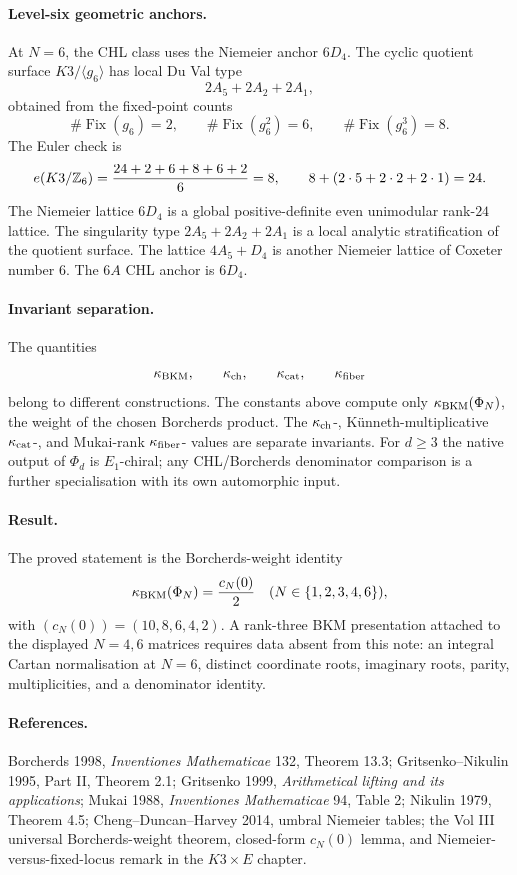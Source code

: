 \paragraph{Level-six geometric anchors.}
At $N=6$, the CHL class uses the Niemeier anchor $6D_4$. The cyclic
quotient surface $K3/\langle g_6\rangle$ has local Du Val type
\[
  2A_5+2A_2+2A_1,
\]
obtained from the fixed-point counts
\[
  \#\operatorname{Fix}(g_6)=2,\qquad
  \#\operatorname{Fix}(g_6^2)=6,\qquad
  \#\operatorname{Fix}(g_6^3)=8.
\]
The Euler check is
\[
  e(K3/\mathbb{Z}_6)=\frac{24+2+6+8+6+2}{6}=8,\qquad
  8+(2\cdot 5+2\cdot 2+2\cdot 1)=24.
\]
The Niemeier lattice $6D_4$ is a global positive-definite even
unimodular rank-$24$ lattice. The singularity type
$2A_5+2A_2+2A_1$ is a local analytic stratification of the quotient
surface. The lattice $4A_5+D_4$ is another Niemeier lattice of Coxeter
number $6$. The $6A$ CHL anchor is $6D_4$.

\paragraph{Invariant separation.}
The quantities
\[
  \kappa_{\mathrm{BKM}},\qquad \kappa_{\mathrm{ch}},\qquad \kappa_{\mathrm{cat}},\qquad \kappa_{\mathrm{fiber}}
\]
belong to different constructions. The constants above compute only
$\kappa_{\mathrm{BKM}}(\Phi_N)$, the weight of the chosen Borcherds product. The
$\kappa_{\mathrm{ch}}$-, K\"unneth-multiplicative $\kappa_{\mathrm{cat}}$-, and Mukai-rank $\kappa_{\mathrm{fiber}}$-
values are separate invariants. For $d\geq 3$ the native output of
$\Phi_d$ is $E_1$-chiral; any CHL/Borcherds denominator comparison is a
further specialisation with its own automorphic input.

\paragraph{Result.}
The proved statement is the Borcherds-weight identity
\[
  \kappa_{\mathrm{BKM}}(\Phi_N)=\frac{c_N(0)}{2}
  \quad (N\in\{1,2,3,4,6\}),
\]
with $(c_N(0))=(10,8,6,4,2)$. A rank-three BKM presentation attached to
the displayed $N=4,6$ matrices requires data absent from this note: an
integral Cartan normalisation at $N=6$, distinct coordinate roots,
imaginary roots, parity, multiplicities, and a denominator identity.

\paragraph{References.}
Borcherds 1998, \emph{Inventiones Mathematicae} 132, Theorem 13.3;
Gritsenko--Nikulin 1995, Part II, Theorem 2.1; Gritsenko 1999,
\emph{Arithmetical lifting and its applications}; Mukai 1988,
\emph{Inventiones Mathematicae} 94, Table 2; Nikulin 1979, Theorem 4.5;
Cheng--Duncan--Harvey 2014, umbral Niemeier tables; the Vol III
universal Borcherds-weight theorem, closed-form $c_N(0)$ lemma, and
Niemeier-versus-fixed-locus remark in the $K3\times E$ chapter.
